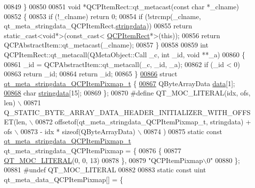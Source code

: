 \begin{DoxyCode}
00849 \}
00850 
00851 \textcolor{keywordtype}{void} *QCPItemRect::qt\_metacast(\textcolor{keyword}{const} \textcolor{keywordtype}{char} *\_clname)
00852 \{
00853     \textcolor{keywordflow}{if} (!\_clname) \textcolor{keywordflow}{return} 0;
00854     \textcolor{keywordflow}{if} (!strcmp(\_clname, qt\_meta\_stringdata\_QCPItemRect.\hyperlink{a00067_a8006d9df79f24f9dc9846ce4485c145a}{stringdata}))
00855         \textcolor{keywordflow}{return} \textcolor{keyword}{static\_cast<}\textcolor{keywordtype}{void}*\textcolor{keyword}{>}(\textcolor{keyword}{const\_cast<} \hyperlink{a00039}{QCPItemRect}*\textcolor{keyword}{>}(\textcolor{keyword}{this}));
00856     \textcolor{keywordflow}{return} QCPAbstractItem::qt\_metacast(\_clname);
00857 \}
00858 
00859 \textcolor{keywordtype}{int} QCPItemRect::qt\_metacall(QMetaObject::Call \_c, \textcolor{keywordtype}{int} \_id, \textcolor{keywordtype}{void} **\_a)
00860 \{
00861     \_id = QCPAbstractItem::qt\_metacall(\_c, \_id, \_a);
00862     \textcolor{keywordflow}{if} (\_id < 0)
00863         \textcolor{keywordflow}{return} \_id;
00864     \textcolor{keywordflow}{return} \_id;
00865 \}
\hypertarget{a00067_source_l00866}{}\hyperlink{a00067}{00866} \textcolor{keyword}{struct }\hyperlink{a00067_db/d53/a00202}{qt\_meta\_stringdata\_QCPItemPixmap\_t} \{
\hypertarget{a00067_source_l00867}{}\hyperlink{a00067_ac2c2965eddf58c85d34bd6a8bc3608fe}{00867}     QByteArrayData \hyperlink{a00067_ac2c2965eddf58c85d34bd6a8bc3608fe}{data}[1];
\hypertarget{a00067_source_l00868}{}\hyperlink{a00067_a4cee80f7af4fafbb06fc161890ced10e}{00868}     \textcolor{keywordtype}{char} \hyperlink{a00067_a4cee80f7af4fafbb06fc161890ced10e}{stringdata}[15];
00869 \};
00870 \textcolor{preprocessor}{#define QT\_MOC\_LITERAL(idx, ofs, len) \(\backslash\)}
00871 \textcolor{preprocessor}{    Q\_STATIC\_BYTE\_ARRAY\_DATA\_HEADER\_INITIALIZER\_WITH\_OFFSET(len, \(\backslash\)}
00872 \textcolor{preprocessor}{    offsetof(qt\_meta\_stringdata\_QCPItemPixmap\_t, stringdata) + ofs \(\backslash\)}
00873 \textcolor{preprocessor}{        - idx * sizeof(QByteArrayData) \(\backslash\)}
00874 \textcolor{preprocessor}{    )}
00875 \textcolor{keyword}{static} \textcolor{keyword}{const} \hyperlink{a00067_db/d53/a00202}{qt\_meta\_stringdata\_QCPItemPixmap\_t} 
      qt\_meta\_stringdata\_QCPItemPixmap = \{
00876     \{
00877 \hyperlink{a00067_a75bb9482d242cde0a06c9dbdc6b83abe}{QT\_MOC\_LITERAL}(0, 0, 13)
00878     \},
00879     \textcolor{stringliteral}{"QCPItemPixmap\(\backslash\)0"}
00880 \};
00881 \textcolor{preprocessor}{#undef QT\_MOC\_LITERAL}
00882 
00883 \textcolor{keyword}{static} \textcolor{keyword}{const} uint qt\_meta\_data\_QCPItemPixmap[] = \{

\end{DoxyCode}
